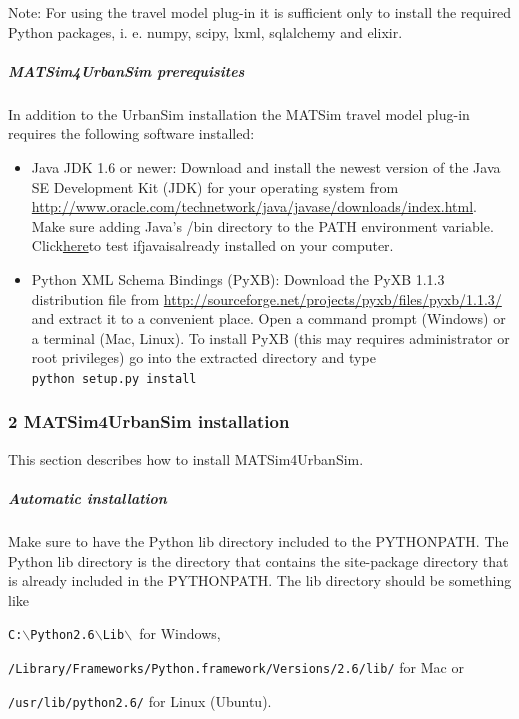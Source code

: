 Note:  For using the travel model plug-in it is sufficient only to install the  required Python packages, i. e. numpy, scipy, lxml, sqlalchemy and  elixir.

\subparagraph{MATSim4UrbanSim prerequisites}

In addition to the UrbanSim installation the MATSim travel model plug-in requires the following software installed:
\begin{itemize}
	\item Java JDK 1.6 or newer: Download and install the newest version  of the Java SE Development Kit (JDK) for your operating system from \href{http://www.oracle.com/technetwork/java/javase/downloads/index.html}{http://www.oracle.com/technetwork/java/javase/downloads/index.html}. Make sure adding Java's /bin directory to the PATH environment variable. Click\href{http://java.com/en/download/testjava.jsp}{here}to test ifjavaisalready installed on your computer.
	\item Python XML Schema Bindings (PyXB): Download the PyXB 1.1.3 distribution file from \href{http://sourceforge.net/projects/pyxb/files/pyxb/1.1.3/}{http://sourceforge.net/projects/pyxb/files/pyxb/1.1.3/}  and extract it to a convenient place. Open a command prompt (Windows)  or a terminal (Mac, Linux). To install PyXB (this may requires  administrator or root privileges) go into the extracted directory and  type
\\


\texttt{python setup.py install}
\end{itemize}

\subsubsection{2 MATSim4UrbanSim installation}

This section describes how to install MATSim4UrbanSim.

\subparagraph{Automatic installation}

Make sure to have the Python lib directory included to the  PYTHONPATH. The Python lib directory is the directory that contains the  site-package directory that is already included in the PYTHONPATH. The  lib directory should be something like


\texttt{C:$\backslash$Python2.6$\backslash$Lib$\backslash$ }for Windows,


\texttt{/Library/Frameworks/Python.framework/Versions/2.6/lib/} for Mac or


\texttt{/usr/lib/python2.6/} for Linux (Ubuntu).

